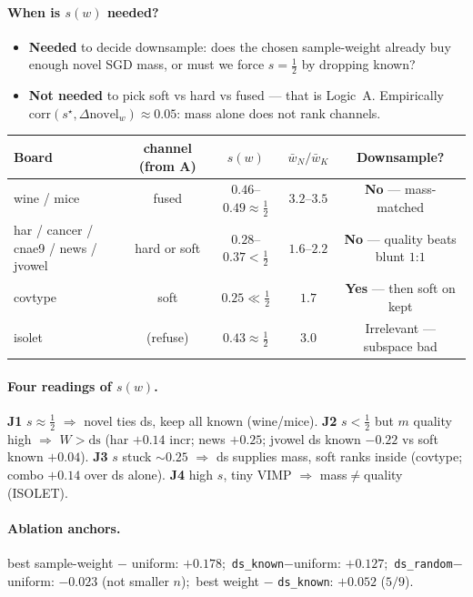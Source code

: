 \documentclass[11pt]{article}
\begin{document}
\paragraph{When is $s(w)$ needed?}
\begin{itemize}
  \item \textbf{Needed} to decide downsample: does the chosen sample-weight
        already buy enough novel SGD mass, or must we force $s=\tfrac12$ by
        dropping known?
  \item \textbf{Not needed} to pick soft vs hard vs fused --- that is Logic~A.
        Empirically $\mathrm{corr}(s^\star,\Delta\mathrm{novel}_w)\approx 0.05$:
        mass alone does not rank channels.
\end{itemize}

\begin{center}
\scriptsize
\begin{tabular}{@{}lcccc@{}}
\toprule
Board & channel (from A) & $s(w)$ & $\bar w_N/\bar w_K$ & Downsample? \\
\midrule
wine / mice & fused & $0.46$--$0.49\approx\tfrac12$ & $3.2$--$3.5$
  & \textbf{No} --- mass-matched \\
har / cancer / cnae9 / news / jvowel
  & hard or soft & $0.28$--$0.37<\tfrac12$ & $1.6$--$2.2$
  & \textbf{No} --- quality beats blunt $1$:$1$ \\
covtype & soft & $0.25\ll\tfrac12$ & $1.7$
  & \textbf{Yes} --- then soft on kept \\
isolet & (refuse) & $0.43\approx\tfrac12$ & $3.0$
  & Irrelevant --- subspace bad \\
\bottomrule
\end{tabular}
\end{center}

\paragraph{Four readings of $s(w)$.}
\textbf{J1} $s\approx\tfrac12$ $\Rightarrow$ novel ties ds, keep all known (wine/mice).
\textbf{J2} $s<\tfrac12$ but $m$ quality high $\Rightarrow$ $W>\mathrm{ds}$
(har $+0.14$ incr; news $+0.25$; jvowel ds known $-0.22$ vs soft known $+0.04$).
\textbf{J3} $s$ stuck $\sim 0.25$ $\Rightarrow$ ds supplies mass, soft ranks inside
(covtype; combo $+0.14$ over ds alone).
\textbf{J4} high $s$, tiny VIMP $\Rightarrow$ mass$\neq$quality (ISOLET).

\paragraph{Ablation anchors.}
best sample-weight $-$ uniform: $+0.178$;\
\texttt{ds\_known}$-$uniform: $+0.127$;\
\texttt{ds\_random}$-$uniform: $-0.023$ (not smaller $n$);\
best weight $-$ \texttt{ds\_known}: $\mathbf{+0.052}$ ($5/9$).
\end{document}
